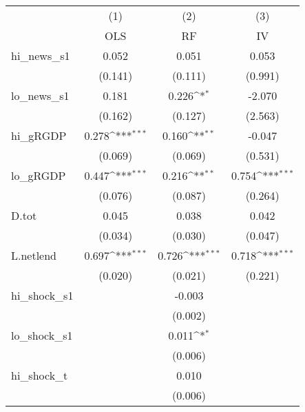 {
\def\sym#1{\ifmmode^{#1}\else\(^{#1}\)\fi}
\begin{tabular}{l*{3}{c}}
\toprule
            &\multicolumn{1}{c}{(1)}&\multicolumn{1}{c}{(2)}&\multicolumn{1}{c}{(3)}\\
            &\multicolumn{1}{c}{OLS}&\multicolumn{1}{c}{RF}&\multicolumn{1}{c}{IV}\\
\midrule
hi\_news\_s1  &       0.052         &       0.051         &       0.053         \\
            &     (0.141)         &     (0.111)         &     (0.991)         \\
\addlinespace
lo\_news\_s1  &       0.181         &       0.226\sym{*}  &      -2.070         \\
            &     (0.162)         &     (0.127)         &     (2.563)         \\
\addlinespace
hi\_gRGDP    &       0.278\sym{***}&       0.160\sym{**} &      -0.047         \\
            &     (0.069)         &     (0.069)         &     (0.531)         \\
\addlinespace
lo\_gRGDP    &       0.447\sym{***}&       0.216\sym{**} &       0.754\sym{***}\\
            &     (0.076)         &     (0.087)         &     (0.264)         \\
\addlinespace
D.tot       &       0.045         &       0.038         &       0.042         \\
            &     (0.034)         &     (0.030)         &     (0.047)         \\
\addlinespace
L.netlend   &       0.697\sym{***}&       0.726\sym{***}&       0.718\sym{***}\\
            &     (0.020)         &     (0.021)         &     (0.221)         \\
\addlinespace
hi\_shock\_s1 &                     &      -0.003         &                     \\
            &                     &     (0.002)         &                     \\
\addlinespace
lo\_shock\_s1 &                     &       0.011\sym{*}  &                     \\
            &                     &     (0.006)         &                     \\
\addlinespace
hi\_shock\_t  &                     &       0.010         &                     \\
            &                     &     (0.006)         &                     \\

\end{tabular}}
